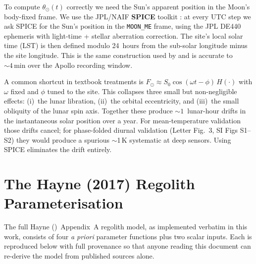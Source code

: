 \documentclass[11pt]{report}
\newcommand{\Hayne}{Hayne (\citeyear{hayne2017})}
\begin{document}
To compute $\theta_\odot(t)$ correctly we need the Sun's apparent
position in the Moon's body-fixed frame. We use the JPL/NAIF
\textbf{SPICE} toolkit \citep{acton1996,acton2018}: at every UTC step we ask
SPICE for the Sun's position in the \texttt{MOON\_ME} frame, using
the JPL DE440 ephemeris with light-time + stellar aberration
correction. The site's local solar time (LST) is then defined
modulo 24~hours from the sub-solar longitude minus the site
longitude. This is the same construction used by \citet{nagihara2018}
and is accurate to $\sim\!4\,\si{\minute}$ over the Apollo recording
window.

\begin{aside}
A common shortcut in textbook treatments is
$F_\odot \approx S_0\cos(\omega t - \phi)\,H(\cdot)$ with $\omega$
fixed and $\phi$ tuned to the site. This collapses three small but
non-negligible effects: (i)~the lunar libration, (ii)~the orbital
eccentricity, and (iii)~the small obliquity of the lunar spin axis.
Together these produce $\sim\!1$~lunar-hour drifts in the
instantaneous solar position over a year. For mean-temperature
validation those drifts cancel; for phase-folded diurnal validation
(Letter Fig.~3, SI Figs S1--S2) they would produce a spurious
$\sim$1\,K systematic at deep sensors. Using SPICE eliminates the
drift entirely.
\end{aside}

\chapter{The Hayne (2017) Regolith Parameterisation}\label{ch:hayne}

The full \Hayne\ Appendix~A regolith model, as implemented verbatim in
this work, consists of four \emph{a priori} parameter functions plus
two scalar inputs. Each is reproduced below with full provenance so
that anyone reading this document can re-derive the model from
published sources alone.
\end{document}
